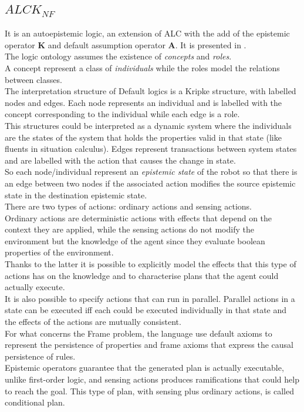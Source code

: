 \documentclass[pdftex,12pt,a4paper]{report}
\begin{document}
\subsection{$ALCK_{NF}$}
It is an autoepistemic logic, an extension of ALC with the add of the epistemic operator \textbf{K} and default assumption operator \textbf{A}. It is presented in \cite{donini1997autoepistemic}.%
\\\noindent The logic ontology assumes the existence of \textit{concepts} and \textit{roles}. 
\\\noindent A concept represent a class of \textit{individuals} while the roles model the relations between classes.
\\\noindent The interpretation structure of Default logics is a Kripke structure, with labelled nodes and edges.
Each node represents an individual and is labelled with the concept corresponding to the individual while each edge is a role. 
\\\noindent This structures could be interpreted as a dynamic system where the individuals are the states of the system that holds the properties valid in that state (like fluents in situation calculus). Edges represent transactions between system states and are labelled with the action that causes the change in state.
\\\noindent So each node/individual represent an \textit{epistemic state} of the robot so that there is an edge between two nodes if the associated action modifies the source epistemic state in the destination epistemic state.
\\\noindent There are two types of actions: ordinary actions and sensing actions.
\\\noindent  Ordinary actions are deterministic actions with effects that depend on the context they are applied, while the sensing actions do not modify the environment but the knowledge of the agent since they evaluate boolean properties of the environment.
\\\noindent  Thanks to the latter it is possible to explicitly model the effects that this type of actions has on the knowledge and to characterise plans that the agent could actually execute.
\\\noindent It is also possible to specify actions that can run in parallel. Parallel actions in a state can be executed iff each could be executed individually in that state and the effects of the actions are mutually consistent.
\\\noindent For what concerns the Frame problem, the language use default axioms to represent the persistence of properties and frame axioms that express the causal persistence of rules.
\\\noindent Epistemic operators guarantee that the generated plan is actually executable, unlike first-order logic, and sensing actions produces ramifications that could help to reach the goal. This type of plan, with sensing plus ordinary actions, is called conditional plan.
\end{document}

